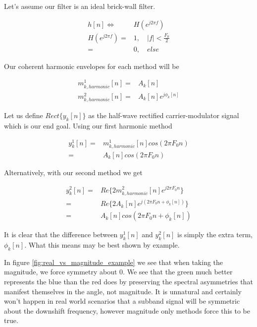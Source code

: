 \documentclass [11pt, proquest,oneside] {ganter_thesis}[2015/03/03]
\begin{document}
Let's assume our filter is an ideal brick-wall filter.

\begin{align}
h[n] \Longleftrightarrow& H(e^{j2\pi f}) \\
H(e^{j2\pi f}) =& 1, \quad |f| < \frac{F_0}{2} \\
=& 0, \quad else \nonumber
\end{align}

Our coherent harmonic envelopes for each method will be

\begin{align}
\label{eq:realVSmag1}
m^1_{k,harmonic}[n] =& A_k[n] \\
m^2_{k,harmonic}[n] =& A_k[n]e^{j\phi_k[n]}
\end{align}

Let us define $Rect\{y_k[n]\}$ as the half-wave rectified carrier-modulator signal which is our end goal.  Using our first harmonic method

\begin{align}
y_k^1[n] =& m^1_{k,harmonic}[n] cos(2\pi F_0 n) \\
=& A_k[n] cos(2\pi F_0 n) \nonumber
\end{align}

Alternatively, with our second method we get

\begin{align}
y_k^2[n] =& Re\{ 2m^2_{k,harmonic}[n] e^{j2\pi F_0 n} \}  \\
=& Re\{ 2A_k[n]e^{j(2\pi F_0 n + \phi_k[n])} \} \nonumber \\
=& A_k[n]cos(2\pi F_0 n + \phi_k[n]) \nonumber
\end{align}

It is clear that the difference between $y_k^1[n]$ and $y_k^2[n]$ is simply the extra term, $\phi_k[n]$.  What this means may be best shown by example.

In figure \ref{fig:real_vs_magnitude_example} we see that when taking the magnitude, we force symmetry about $0$.  We see that the green much better represents the blue than the red does by preserving the spectral asymmetries that manifest themselves in the angle, not magnitude.  It is unnatural and certainly won't happen in real world scenarios that a subband signal will be symmetric about the downshift frequency, however magnitude only methods force this to be true.
\end{document}
